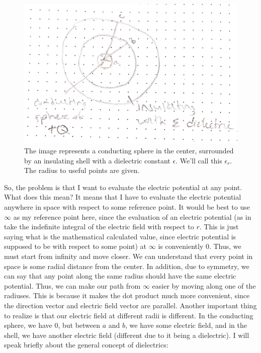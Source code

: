 \documentclass{article}
\begin{document}
\pagebreak
\begin{figure}[ht]
\center
\includegraphics[width=.3\textwidth]{images/Week2pic1.jpg}
\caption{The image represents a conducting sphere in the center, surrounded by an insulating shell with a dielectric constant $\epsilon$. We'll call this $\epsilon_r$. The radius to useful points are given.}
\end{figure}

So, the problem is that I want to evaluate the electric potential at any point. What does this mean? It means that I have to evaluate the electric potential anywhere in space with respect to some reference point. It would be best to use $\infty$ as my reference point here, since the evaluation of an electric potential (as in take the indefinite integral of the electric field with respect to $r$. This is just saying what is the mathematical calculated value, since electric potential is supposed to be with respect to some point) at $\infty$ is conveniently 0. Thus, we must start from infinity and move closer. We can understand that every point in space is some radial distance from the center. In addition, due to symmetry, we can say that any point along the same radius should have the same electric potential. Thus, we can make our path from $\infty$ easier by moving along one of the radiuses. This is because it makes the dot product much more convenient, since the direction vector and electric field vector are parallel. Another important thing to realize is that our electric field at different radii is different. In the conducting sphere, we have $0$, but between $a$ and $b$, we have some electric field, and in the shell, we have another electric field (different due to it being a dielectric). I will speak briefly about the general concept of dielectrics:\\
\\
\end{document}
